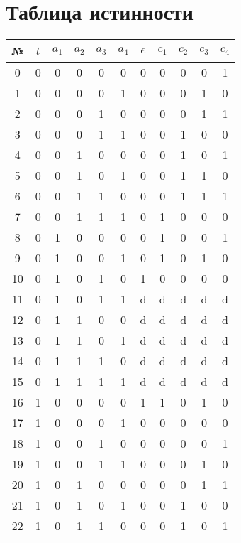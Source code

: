 \documentclass{article}
\begin{document}
\section*{Таблица истинности}
\begin{center}\begin{tabular}{|c|c|cccc|ccccc|}
    \hline № & $t$ & $a_1$ & $a_2$ & $a_3$ & $a_4$ & $e$ & $c_1$ & $c_2$ & $c_3$ & $c_4$ \\ \hline
    0 & 0 & 0 & 0 & 0 & 0 & 0 & 0 & 0 & 0 & 1 \\ \hline
    1 & 0 & 0 & 0 & 0 & 1 & 0 & 0 & 0 & 1 & 0 \\ \hline
    2 & 0 & 0 & 0 & 1 & 0 & 0 & 0 & 0 & 1 & 1 \\ \hline
    3 & 0 & 0 & 0 & 1 & 1 & 0 & 0 & 1 & 0 & 0 \\ \hline
    4 & 0 & 0 & 1 & 0 & 0 & 0 & 0 & 1 & 0 & 1 \\ \hline
    5 & 0 & 0 & 1 & 0 & 1 & 0 & 0 & 1 & 1 & 0 \\ \hline
    6 & 0 & 0 & 1 & 1 & 0 & 0 & 0 & 1 & 1 & 1 \\ \hline
    7 & 0 & 0 & 1 & 1 & 1 & 0 & 1 & 0 & 0 & 0 \\ \hline
    8 & 0 & 1 & 0 & 0 & 0 & 0 & 1 & 0 & 0 & 1 \\ \hline
    9 & 0 & 1 & 0 & 0 & 1 & 0 & 1 & 0 & 1 & 0 \\ \hline
    10 & 0 & 1 & 0 & 1 & 0 & 1 & 0 & 0 & 0 & 0 \\ \hline
    11 & 0 & 1 & 0 & 1 & 1 & d & d & d & d & d \\ \hline
    12 & 0 & 1 & 1 & 0 & 0 & d & d & d & d & d \\ \hline
    13 & 0 & 1 & 1 & 0 & 1 & d & d & d & d & d \\ \hline
    14 & 0 & 1 & 1 & 1 & 0 & d & d & d & d & d \\ \hline
    15 & 0 & 1 & 1 & 1 & 1 & d & d & d & d & d \\ \hline
    16 & 1 & 0 & 0 & 0 & 0 & 1 & 1 & 0 & 1 & 0 \\ \hline
    17 & 1 & 0 & 0 & 0 & 1 & 0 & 0 & 0 & 0 & 0 \\ \hline
    18 & 1 & 0 & 0 & 1 & 0 & 0 & 0 & 0 & 0 & 1 \\ \hline
    19 & 1 & 0 & 0 & 1 & 1 & 0 & 0 & 0 & 1 & 0 \\ \hline
    20 & 1 & 0 & 1 & 0 & 0 & 0 & 0 & 0 & 1 & 1 \\ \hline
    21 & 1 & 0 & 1 & 0 & 1 & 0 & 0 & 1 & 0 & 0 \\ \hline
    22 & 1 & 0 & 1 & 1 & 0 & 0 & 0 & 1 & 0 & 1 \\ \hline

\end{tabular}
\end{center}
\end{document}

